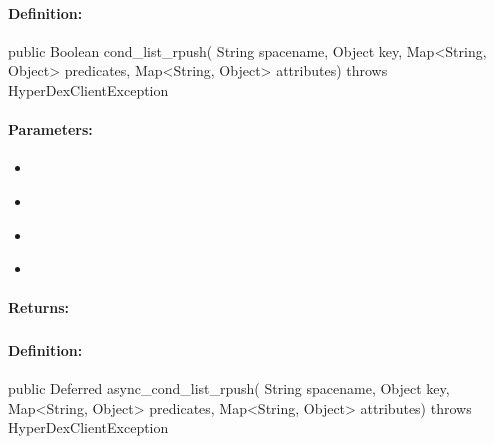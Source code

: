 \paragraph{Definition:}
\begin{javacode}
public Boolean cond_list_rpush(
        String spacename,
        Object key,
        Map<String, Object> predicates,
        Map<String, Object> attributes) throws HyperDexClientException
\end{javacode}

\paragraph{Parameters:}
\begin{itemize}[noitemsep]
\item {}\\

\item {}\\

\item {}\\

\item {}\\

\end{itemize}

\paragraph{Returns:}


\pagebreak
\subsubsection{}
\label{api:java:async_cond_list_rpush}


\paragraph{Definition:}
\begin{javacode}
public Deferred async_cond_list_rpush(
        String spacename,
        Object key,
        Map<String, Object> predicates,
        Map<String, Object> attributes) throws HyperDexClientException
\end{javacode}


